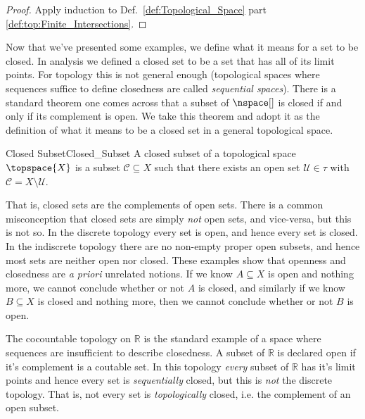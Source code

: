 \documentclass{book}                                                           %
\begin{document}
                \begin{proof}
                    Apply induction to Def.~\ref{def:Topological_Space}
                    part \ref{def:top:Finite_Intersections}.
                \end{proof}
                Now that we've presented some examples, we define what it means
                for a set to be closed. In analysis we
                defined a closed set to be a set that has all of its limit
                points. For topology this is not general enough (topological
                spaces where sequences suffice to define closedness are called
                \textit{sequential spaces}). There is a
                standard theorem one comes across that a subset of $\nspace[]$
                is closed if and only if its complement is open. We take this
                theorem and adopt it as the definition of what it means to be a
                closed set in a general topological space.
                \begin{fdefinition}{Closed Subset}{Closed_Subset}
                    A closed subset of a topological space $\topspace{X}$ is a
                    subset $\mathcal{C}\subseteq{X}$ such that there exists an
                    open set $\mathcal{U}\in\tau$ with
                    $\mathcal{C}=X\setminus\mathcal{U}$.%
                \end{fdefinition}
                That is, closed sets are the complements of open sets. There is
                a common misconception that closed sets are simply \textit{not}
                open sets, and vice-versa, but this is not so. In the discrete
                topology every set is open, and hence every set is closed. In
                the indiscrete topology there are no non-empty proper open
                subsets, and hence most sets are neither open nor closed. These
                examples show that openness and closedness are
                \textit{a priori} unrelated notions. If we know $A\subseteq{X}$
                is open and nothing more, we cannot conclude whether or not $A$
                is closed, and similarly if we know $B\subseteq{X}$ is closed
                and nothing more, then we cannot conclude whether or not $B$ is
                open.
                \begin{example}
                    The cocountable topology on $\mathbb{R}$ is the standard
                    example of a space where sequences are insufficient to
                    describe closedness. A subset of $\mathbb{R}$ is declared
                    open if it's complement is a coutable set. In this topology
                    \textit{every} subset of $\mathbb{R}$ has it's limit points
                    and hence every set is \textit{sequentially} closed, but
                    this is \textit{not} the discrete topology. That is, not
                    every set is \textit{topologically} closed, i.e. the
                    complement of an open subset.
                \end{example}
\end{document}
